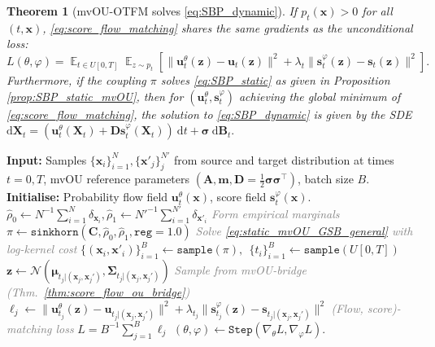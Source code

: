 \documentclass{article}
\renewcommand{\Comment}[1]{\hfill\textcolor{gray}{\textit{#1}}}
\newcommand{\diff}{\mathrm{d}}
\newcommand{\E}{\mathbb{E}}
\newcommand{\Nc}{\mathcal{N}}
\theoremstyle{newstyle}
\newtheorem{thm}{Theorem}
\begin{document}
\begin{thm}[mvOU-OTFM solves \eqref{eq:SBP_dynamic}]\label{thm:consistent}
  If $p_t(\bm{x}) > 0$ for all $(t, \bm{x})$, \eqref{eq:score_flow_matching} shares the same gradients as the \emph{unconditional} loss:
  \(
    L(\theta, \varphi) = \mathop{\E}_{t \in U[0, T]} \mathop{\E}_{z \sim p_t} [ \| \bm{u}^\theta_t(\bm{z}) - \bm{u}_{t}(\bm{z}) \|^2 + \lambda_t \| \bm{s}^\varphi_t(\bm{z}) - \bm{s}_{t}(\bm{z}) \|^2 ]. 
  \)
  Furthermore, if the coupling $\pi$ solves \eqref{eq:SBP_static} as given in Proposition \ref{prop:SBP_static_mvOU}, then for $(\bm{u}_t^\theta, \bm{s}_t^\varphi)$ achieving the global minimum of \eqref{eq:score_flow_matching}, the solution to \eqref{eq:SBP_dynamic} is given by the SDE
  \(
    \diff \bm{X}_t = (\bm{u}_t^\theta(\bm{X}_t) + \bm{D} \bm{s}_t^\varphi(\bm{X}_t)) \: \diff t + \bm{\sigma} \: \diff \bm{B}_t. 
  \)
\end{thm}

\begin{algorithm}[t!]
  \small
  \caption{mvOU-OTFM: score and flow matching for mvOU-Schr\"odinger Bridges}
  \begin{algorithmic}
    \State \textbf{Input:} Samples $\{ \bm{x}_i \}_{i = 1}^{N}, \{ \bm{x}'_j \}_j^{N'}$ from source and target distribution at times $t = 0, T$, mvOU reference parameters $(\bm{A}, \bm{m}, \bm{D} = \frac{1}{2}\bm{\sigma}\bm{\sigma}^\top)$, batch size $B$. \nonumber
    \State \textbf{Initialise:} Probability flow field $\bm{u}^\theta_t(\bm{x})$, score field $\bm{s}^\varphi_t(\bm{x})$.
    \State $\hat{\rho}_0 \gets N^{-1} \sum_{i = 1}^N \delta_{\bm{x}_i}, \hat{\rho}_1 \gets {N'}^{-1} \sum_{i = 1}^{N'} \delta_{\bm{x}'_i}$ \Comment{Form empirical marginals}
    \State $\pi \gets \texttt{sinkhorn}(\bm{C}, \hat{\rho}_0, \hat{\rho}_1, \texttt{reg} = 1.0)$ \Comment{Solve \eqref{eq:static_mvOU_GSB_general} with log-kernel cost}
      \State $\{ (\bm{x}_i, \bm{x}'_i) \}_{i = 1}^{B} \gets \texttt{sample}(\pi), \:\: \{ t_i \}_{i=1}^B \gets \texttt{sample}(U[0, T])$
        \State $\bm{z} \gets \Nc(\bm{\mu}_{t_j | (\bm{x}_j, \bm{x}_j')}, \bm{\Sigma}_{t_j | (\bm{x}_j, \bm{x}_j')})$ \Comment{Sample from mvOU-bridge (Thm.~\ref{thm:score_flow_ou_bridge})}
        \State $\ell_j \gets \| \bm{u}^\theta_{t_j}(\bm{z}) - \bm{u}_{t_j |(\bm{x}_j, \bm{x}_j')} \|^2 + \lambda_{t_j} \| \bm{s}_{t_j}^\varphi(\bm{z}) - \bm{s}_{t_j | (\bm{x}_j, \bm{x}_j')} \|^2$ \Comment{(Flow, score)-matching loss}
      \EndFor
      \State $L = B^{-1} \sum_{j = 1}^B \ell_j$
      \State $(\theta, \varphi) \gets \texttt{Step}(\nabla_\theta L, \nabla_\varphi L)$. 
    \EndWhile
  \end{algorithmic}
  \label{alg:mvOU_OTFM}
\end{algorithm} 
\end{document}
